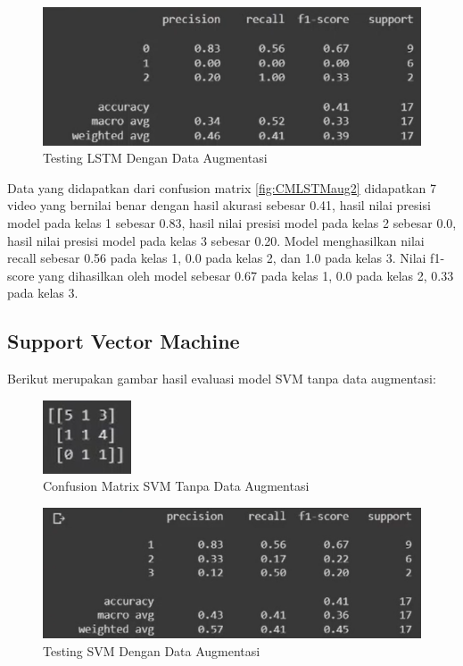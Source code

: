 \begin{figure} [H] \centering
  \includegraphics[scale=1]{gambar/scoreLSTMaug2.png}
  \caption{Testing LSTM Dengan Data Augmentasi}
  \label{fig:ScoreLSTMaug2}
\end{figure}
Data yang didapatkan dari confusion matrix \ref{fig:CMLSTMaug2} didapatkan 7 video yang bernilai benar
dengan hasil akurasi sebesar 0.41, hasil nilai presisi model pada kelas 1 sebesar 0.83, hasil nilai
presisi model pada kelas 2 sebesar 0.0, hasil nilai presisi model pada kelas 3 sebesar 0.20. Model menghasilkan
nilai recall sebesar 0.56 pada kelas 1, 0.0 pada kelas 2, dan 1.0 pada kelas 3. Nilai f1-score yang dihasilkan
oleh model sebesar 0.67 pada kelas 1, 0.0 pada kelas 2, 0.33 pada kelas 3.

\subsection{Support Vector Machine}
Berikut merupakan gambar hasil evaluasi model SVM tanpa data augmentasi:

\newpage
\begin{figure} [H] \centering
  \includegraphics[scale=5]{gambar/CMSVMnoAug2.png}
  \caption{Confusion Matrix SVM Tanpa Data Augmentasi}
  \label{fig:CMSVMnoaug2}
\end{figure}

\begin{figure} [H] \centering
  \includegraphics[scale=1]{gambar/scoreSVMnoaug2.png}
  \caption{Testing SVM Dengan Data Augmentasi}
  \label{fig:ScoreSVMnoaug2}
\end{figure}

